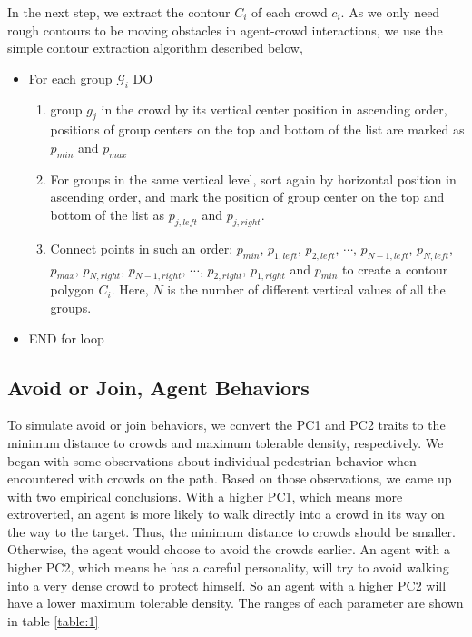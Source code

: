 \documentclass[conference]{acmsiggraph}
\begin{document}
In the next step, we extract the contour $C_i$ of each crowd $c_i$. As we only need rough contours to be moving obstacles in agent-crowd interactions, we use the simple contour extraction algorithm described below,

\begin{itemize}
\item For each group $\mathcal{G}_i$ DO
\begin{enumerate}
\item group $g_j$ in the crowd by its vertical center position in ascending order, positions of group centers on the top and bottom of the list are marked as $p_{min}$ and $p_{max}$
\item For groups in the same vertical level, sort again by horizontal position in ascending order, and mark the position of group center on the top and bottom of the list as $p_{j, left}$ and $p_{j, right}$.
\item Connect points in such an order: $p_{min}$, $p_{1, left}$, $p_{2, left}$, $\cdots$, $p_{N-1, left}$, $p_{N, left}$, $p_{max}$, $p_{N, right}$, $p_{N-1, right}$, $\cdots$, $p_{2, right}$, $p_{1, right}$ and $p_{min}$ to create a contour polygon $C_i$. Here, $N$ is the number of different vertical values of all the groups.
\end{enumerate}
\item END for loop
\end{itemize}

\subsection{Avoid or Join, Agent Behaviors}
\label{section:5.2}
To simulate avoid or join behaviors, we convert the PC1 and PC2 traits to the minimum distance to crowds and maximum tolerable density, respectively. We began with some observations about individual pedestrian behavior when encountered with crowds on the path. Based on those observations, we came up with two empirical conclusions. With a higher PC1, which means more extroverted, an agent is more likely to walk directly into a crowd in its way on the way to the target. Thus, the minimum distance to crowds should be smaller. Otherwise, the agent would choose to avoid the crowds earlier. An agent with a higher PC2, which means he has a careful personality, will try to avoid walking into a very dense crowd to protect himself. So an agent with a higher PC2 will have a lower maximum tolerable density. The ranges of each parameter are shown in table \ref{table:1}
\end{document}
